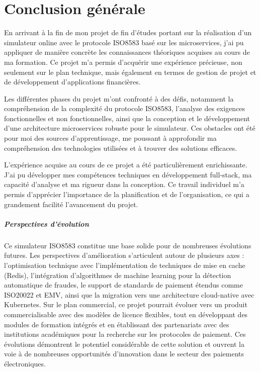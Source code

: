 \thispagestyle{empty}
\pagestyle{empty}

\adjustmtc
\chapter*{Conclusion générale}
\justifying

En arrivant à la fin de mon projet de fin d'études portant sur la réalisation d'un simulateur online avec le protocole ISO8583 basé sur les microservices, j'ai pu appliquer de manière concrète les connaissances théoriques acquises au cours de ma formation. Ce projet m'a permis d'acquérir une expérience précieuse, non seulement sur le plan technique, mais également en termes de gestion de projet et de développement d'applications financières.

Les différentes phases du projet m'ont confronté à des défis, notamment la compréhension de la complexité du protocole ISO8583, l'analyse des exigences fonctionnelles et non fonctionnelles, ainsi que la conception et le développement d'une architecture microservices robuste pour le simulateur. Ces obstacles ont été pour moi des sources d'apprentissage, me poussant à approfondir ma compréhension des technologies utilisées et à trouver des solutions efficaces.

L'expérience acquise au cours de ce projet a été particulièrement enrichissante. J'ai pu développer mes compétences techniques en développement full-stack, ma capacité d'analyse et ma rigueur dans la conception. Ce travail individuel m'a permis d'apprécier l'importance de la planification et de l'organisation, ce qui a grandement facilité l'avancement du projet.

\paragraph*{Perspectives d'évolution}

Ce simulateur ISO8583 constitue une base solide pour de nombreuses évolutions futures. Les perspectives d'amélioration s'articulent autour de plusieurs axes : l'optimisation technique avec l'implémentation de techniques de mise en cache (Redis), l'intégration d'algorithmes de machine learning pour la détection automatique de fraudes, le support de standards de paiement étendus comme ISO20022 et EMV, ainsi que la migration vers une architecture cloud-native avec Kubernetes. Sur le plan commercial, ce projet pourrait évoluer vers un produit commercialisable avec des modèles de licence flexibles, tout en développant des modules de formation intégrés et en établissant des partenariats avec des institutions académiques pour la recherche sur les protocoles de paiement. Ces évolutions démontrent le potentiel considérable de cette solution et ouvrent la voie à de nombreuses opportunités d'innovation dans le secteur des paiements électroniques.

